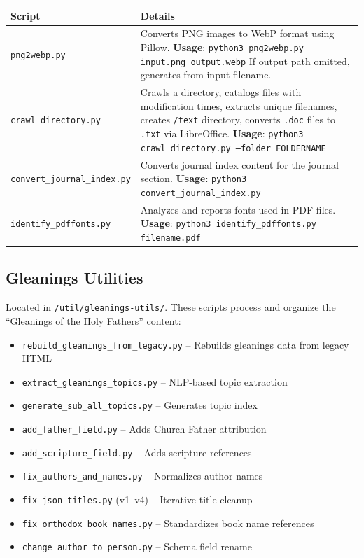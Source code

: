 \documentclass[12pt]{article}
\begin{document}
{\footnotesize
\begin{longtable}{p{4.5cm}p{8cm}}
\toprule
\textbf{Script} & \textbf{Details} \\
\midrule
\texttt{png2webp.py} &
    Converts PNG images to WebP format using Pillow.
    \newline\textbf{Usage}: \texttt{python3 png2webp.py input.png output.webp}
    \newline If output path omitted, generates from input filename. \\
\midrule
\texttt{crawl\_directory.py} &
    Crawls a directory, catalogs files with modification times, extracts unique filenames,
    creates \texttt{/text} directory, converts \texttt{.doc} files to \texttt{.txt} via LibreOffice.
    \newline\textbf{Usage}: \texttt{python3 crawl\_directory.py --folder FOLDERNAME} \\
\midrule
\texttt{convert\_journal\_index.py} &
    Converts journal index content for the journal section.
    \newline\textbf{Usage}: \texttt{python3 convert\_journal\_index.py} \\
\midrule
\texttt{identify\_pdffonts.py} &
    Analyzes and reports fonts used in PDF files.
    \newline\textbf{Usage}: \texttt{python3 identify\_pdffonts.py filename.pdf} \\
\bottomrule
\end{longtable}
}

\subsection{Gleanings Utilities}

Located in \texttt{/util/gleanings-utils/}. These scripts process and organize the ``Gleanings of the Holy Fathers'' content:

\begin{itemize}
    \item \texttt{rebuild\_gleanings\_from\_legacy.py} -- Rebuilds gleanings data from legacy HTML
    \item \texttt{extract\_gleanings\_topics.py} -- NLP-based topic extraction
    \item \texttt{generate\_sub\_all\_topics.py} -- Generates topic index
    \item \texttt{add\_father\_field.py} -- Adds Church Father attribution
    \item \texttt{add\_scripture\_field.py} -- Adds scripture references
    \item \texttt{fix\_authors\_and\_names.py} -- Normalizes author names
    \item \texttt{fix\_json\_titles.py} (v1--v4) -- Iterative title cleanup
    \item \texttt{fix\_orthodox\_book\_names.py} -- Standardizes book name references
    \item \texttt{change\_author\_to\_person.py} -- Schema field rename
\end{itemize}
\end{document}
